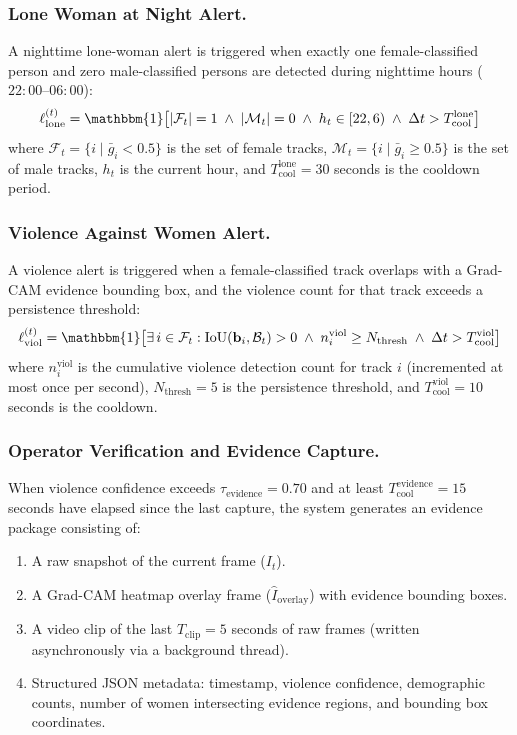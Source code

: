 \documentclass[11pt,a4paper]{article}
\begin{document}
\subsubsection{Lone Woman at Night Alert.}
A nighttime lone-woman alert is triggered when exactly one female-classified person and zero male-classified persons are detected during nighttime hours ($22\!:\!00$--$06\!:\!00$):
\begin{equation}
\ell_{\text{lone}}^{(t)} = \mathbbm{1}\!\left[|\mathcal{F}_t| = 1 \;\wedge\; |\mathcal{M}_t| = 0 \;\wedge\; h_t \in [22, 6) \;\wedge\; \Delta t > T_{\text{cool}}^{\text{lone}}\right]
\label{eq:lone_alert}
\end{equation}
where $\mathcal{F}_t = \{i \mid \bar{g}_i < 0.5\}$ is the set of female tracks, $\mathcal{M}_t = \{i \mid \bar{g}_i \geq 0.5\}$ is the set of male tracks, $h_t$ is the current hour, and $T_{\text{cool}}^{\text{lone}} = 30$ seconds is the cooldown period.

\subsubsection{Violence Against Women Alert.}
A violence alert is triggered when a female-classified track overlaps with a Grad-CAM evidence bounding box, and the violence count for that track exceeds a persistence threshold:
\begin{equation}
\ell_{\text{viol}}^{(t)} = \mathbbm{1}\!\left[\exists\, i \in \mathcal{F}_t : \text{IoU}(\mathbf{b}_i, \mathcal{B}_t) > 0 \;\wedge\; n_i^{\text{viol}} \geq N_{\text{thresh}} \;\wedge\; \Delta t > T_{\text{cool}}^{\text{viol}}\right]
\label{eq:viol_alert}
\end{equation}
where $n_i^{\text{viol}}$ is the cumulative violence detection count for track $i$ (incremented at most once per second), $N_{\text{thresh}} = 5$ is the persistence threshold, and $T_{\text{cool}}^{\text{viol}} = 10$ seconds is the cooldown.

\subsubsection{Operator Verification and Evidence Capture.}
When violence confidence exceeds $\tau_{\text{evidence}} = 0.70$ and at least $T_{\text{cool}}^{\text{evidence}} = 15$ seconds have elapsed since the last capture, the system generates an evidence package consisting of:
\begin{enumerate}[nosep]
    \item A raw snapshot of the current frame ($I_t$).
    \item A Grad-CAM heatmap overlay frame ($\hat{I}_{\text{overlay}}$) with evidence bounding boxes.
    \item A video clip of the last $T_{\text{clip}} = 5$ seconds of raw frames (written asynchronously via a background thread).
    \item Structured JSON metadata: timestamp, violence confidence, demographic counts, number of women intersecting evidence regions, and bounding box coordinates.
\end{enumerate}
\end{document}
